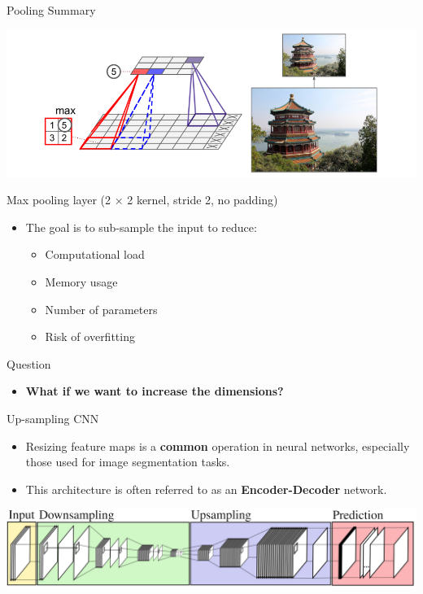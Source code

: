 \documentclass[default, aspectratio=169]{beamer}
\begin{document}
	\begin{frame}{Pooling Summary}
		\begin{minipage}{0.5\textwidth}
			\centering
			\includegraphics[keepaspectratio, scale=0.25]{pic/Pooling_2.png}
			
			\vspace{0.3cm}
			\small Max pooling layer (2 $\times$ 2 kernel, stride 2, no padding)
		\end{minipage}%
		\hspace{0.4cm}  %
		\begin{minipage}{0.45\textwidth}
			\begin{itemize}
				\item The goal is to sub-sample the input to reduce:
				\begin{itemize}
					\item Computational load
					\item Memory usage
					\item Number of parameters
					\item Risk of overfitting
				\end{itemize}
			\end{itemize}
		\end{minipage}
	\end{frame}
	\begin{frame}{Question}
		\centering
		\begin{itemize}
			\centering
			\item \Large \textbf{What if we want to increase the dimensions?}
		\end{itemize}
	\end{frame}
	\begin{frame}{Up-sampling CNN}
		\vspace{0.5cm}
		\begin{itemize}
			\item Resizing feature maps is a \textbf{common} operation in neural networks, especially those used for image segmentation tasks.
			\item This architecture is often referred to as an \textbf{Encoder-Decoder} network.
		\end{itemize}
		\bigskip
		\centering
		\includegraphics[keepaspectratio, scale=0.2]{pic/Upsamlpe_0.png}
		
	\end{frame}
\end{document}
